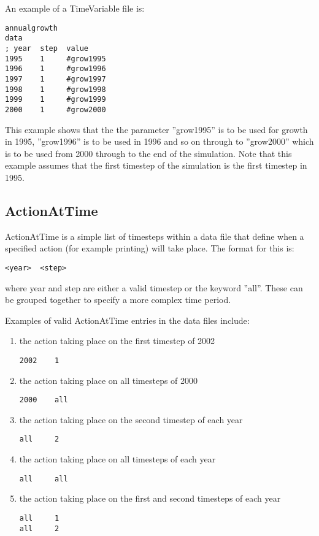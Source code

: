\documentclass[10pt,twoside]{book}
\begin{document}
An example of a TimeVariable file is:

{\small\begin{verbatim}
annualgrowth
data
; year  step  value
1995    1     #grow1995
1996    1     #grow1996
1997    1     #grow1997
1998    1     #grow1998
1999    1     #grow1999
2000    1     #grow2000
\end{verbatim}}

This example shows that the the parameter ''grow1995'' is to be used for growth in 1995, ''grow1996'' is to be used in 1996 and so on through to ''grow2000'' which is to be used from 2000 through to the end of the simulation.  Note that this example assumes that the first timestep of the simulation is the first timestep in 1995.

\subsection{ActionAtTime}
ActionAtTime is a simple list of timesteps within a data file that define when a specified action (for example printing) will take place.  The format for this is:

{\small\begin{verbatim}
<year>  <step>
\end{verbatim}}

where year and step are either a valid timestep or the keyword ''all''.  These can be grouped together to specify a more complex time period.

\bigskip
Examples of valid ActionAtTime entries in the data files include:

\begin{enumerate}
\item the action taking place on the first timestep of 2002
{\small\begin{verbatim}
2002    1
\end{verbatim}}
\item the action taking place on all timesteps of 2000
{\small\begin{verbatim}
2000    all
\end{verbatim}}
\item the action taking place on the second timestep of each year
{\small\begin{verbatim}
all     2
\end{verbatim}}
\item the action taking place on all timesteps of each year
{\small\begin{verbatim}
all     all
\end{verbatim}}
\item the action taking place on the first and second timesteps of each year
{\small\begin{verbatim}
all     1
all     2
\end{verbatim}}
\end{enumerate}
\end{document}
